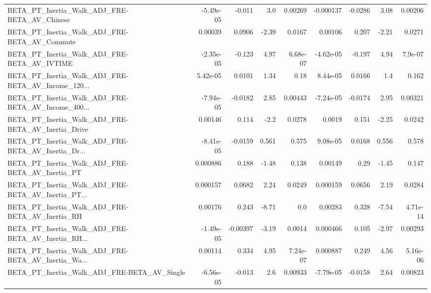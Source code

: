 \begin{tabular}{lrrrrrrrr}
BETA\_PT\_Inertia\_Walk\_ADJ\_FRE-BETA\_AV\_Chinese       &   -5.49e-05 &       -0.011 &      3.0 &  0.00269 &  -0.000137 &     -0.0286 &         3.08 &       0.00206 \\
BETA\_PT\_Inertia\_Walk\_ADJ\_FRE-BETA\_AV\_Commute       &     0.00039 &       0.0906 &    -2.39 &   0.0167 &    0.00106 &       0.207 &        -2.21 &        0.0271 \\
BETA\_PT\_Inertia\_Walk\_ADJ\_FRE-BETA\_AV\_IVTIME        &   -2.35e-05 &       -0.123 &     4.97 & 6.68e-07 &  -4.62e-05 &      -0.197 &         4.94 &       7.9e-07 \\
BETA\_PT\_Inertia\_Walk\_ADJ\_FRE-BETA\_AV\_Income\_120... &    5.42e-05 &       0.0101 &     1.34 &     0.18 &   8.44e-05 &      0.0166 &          1.4 &         0.162 \\
BETA\_PT\_Inertia\_Walk\_ADJ\_FRE-BETA\_AV\_Income\_400... &   -7.94e-05 &      -0.0182 &     2.85 &  0.00443 &  -7.24e-05 &     -0.0174 &         2.95 &       0.00321 \\
BETA\_PT\_Inertia\_Walk\_ADJ\_FRE-BETA\_AV\_Inertia\_Drive &     0.00146 &        0.114 &     -2.2 &   0.0278 &     0.0019 &       0.151 &        -2.25 &        0.0242 \\
BETA\_PT\_Inertia\_Walk\_ADJ\_FRE-BETA\_AV\_Inertia\_Dr... &   -8.41e-05 &      -0.0159 &    0.561 &    0.575 &   9.08e-05 &      0.0168 &        0.556 &         0.578 \\
BETA\_PT\_Inertia\_Walk\_ADJ\_FRE-BETA\_AV\_Inertia\_PT    &    0.000886 &        0.188 &    -1.48 &    0.138 &    0.00149 &        0.29 &        -1.45 &         0.147 \\
BETA\_PT\_Inertia\_Walk\_ADJ\_FRE-BETA\_AV\_Inertia\_PT... &    0.000157 &       0.0682 &     2.24 &   0.0249 &   0.000159 &      0.0656 &         2.19 &        0.0284 \\
BETA\_PT\_Inertia\_Walk\_ADJ\_FRE-BETA\_AV\_Inertia\_RH    &     0.00176 &        0.243 &    -8.71 &      0.0 &    0.00283 &       0.328 &        -7.54 &      4.71e-14 \\
BETA\_PT\_Inertia\_Walk\_ADJ\_FRE-BETA\_AV\_Inertia\_RH... &   -1.49e-05 &     -0.00397 &    -3.19 &   0.0014 &   0.000466 &       0.105 &        -2.97 &       0.00293 \\
BETA\_PT\_Inertia\_Walk\_ADJ\_FRE-BETA\_AV\_Inertia\_Wa... &     0.00114 &        0.334 &     4.95 & 7.24e-07 &   0.000887 &       0.249 &         4.56 &      5.16e-06 \\
BETA\_PT\_Inertia\_Walk\_ADJ\_FRE-BETA\_AV\_Single        &   -6.56e-05 &       -0.013 &      2.6 &  0.00933 &  -7.79e-05 &     -0.0158 &         2.64 &       0.00823 \\

\end{tabular}
